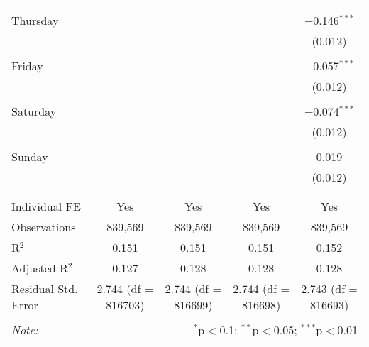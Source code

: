 \documentclass[
]{article}
\begin{document}
\begin{table}[!htbp]
{\begin{tabular}{@{\extracolsep{5pt}}lcccc}
  & & & & \\ 
 Thursday &  &  &  & $-$0.146$^{***}$ \\ 
  &  &  &  & (0.012) \\ 
  & & & & \\ 
 Friday &  &  &  & $-$0.057$^{***}$ \\ 
  &  &  &  & (0.012) \\ 
  & & & & \\ 
 Saturday &  &  &  & $-$0.074$^{***}$ \\ 
  &  &  &  & (0.012) \\ 
  & & & & \\ 
 Sunday &  &  &  & 0.019 \\ 
  &  &  &  & (0.012) \\ 
  & & & & \\ 
\hline \\[-1.8ex] 
Individual FE & Yes & Yes & Yes & Yes \\ 
Observations & 839,569 & 839,569 & 839,569 & 839,569 \\ 
R$^{2}$ & 0.151 & 0.151 & 0.151 & 0.152 \\ 
Adjusted R$^{2}$ & 0.127 & 0.128 & 0.128 & 0.128 \\ 
Residual Std. Error & 2.744 (df = 816703) & 2.744 (df = 816699) & 2.744 (df = 816698) & 2.743 (df = 816693) \\ 
\hline 
\hline \\[-1.8ex] 
\textit{Note:}  & \multicolumn{4}{r}{$^{*}$p$<$0.1; $^{**}$p$<$0.05; $^{***}$p$<$0.01} \\ 
\end{tabular}
} 
\end{table} 
\newpage
\end{document}
